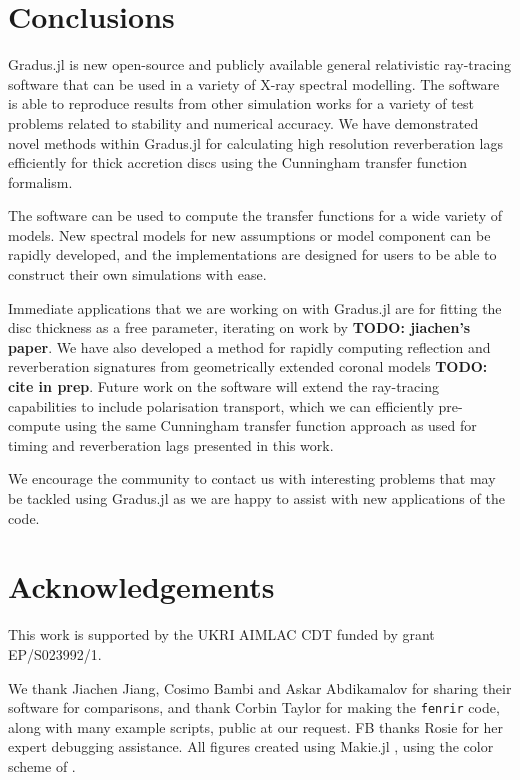 \documentclass[fleqn,usenatbib]{mnras}
\newcommand{\todo}[1]{{\noindent \bf \color{red} TODO: #1}}
\newcommand{\Gradus}{Gradus.jl\xspace}
\begin{document}
\section{Conclusions}
\label{sec:conclusion}

\Gradus is new open-source and publicly available general relativistic
ray-tracing software that can be used in a variety of X-ray spectral modelling.
The software is able to reproduce results from other simulation works for a
variety of test problems related to stability and numerical accuracy. We have
demonstrated novel methods within \Gradus for calculating high resolution
reverberation lags efficiently for thick accretion discs using the Cunningham
transfer function formalism.

The software can be used to compute the transfer functions for a wide variety of
models. New spectral models for new assumptions or model component can be
rapidly developed, and the implementations are designed for users to be able to
construct their own simulations with ease.

Immediate applications that we are working on with \Gradus are for fitting the
disc thickness as a free parameter, iterating on work by \todo{jiachen's paper}.
We have also developed a method for rapidly computing reflection and
reverberation signatures from geometrically extended coronal models \todo{cite
in prep}. Future work on the software will extend the ray-tracing capabilities
to include polarisation transport, which we can efficiently pre-compute using
the same Cunningham transfer function approach as used for timing and
reverberation lags presented in this work.

We encourage the community to contact us with interesting problems that may be
tackled using \Gradus as we are happy to assist with new applications of the
code.

\section*{Acknowledgements}
This work is supported by the UKRI AIMLAC CDT funded by grant EP/S023992/1.

We thank Jiachen Jiang, Cosimo Bambi and Askar Abdikamalov for sharing their
software for comparisons, and thank Corbin Taylor for making the
\texttt{fenrir} code, along with many example scripts, public at our request. FB thanks Rosie for her expert debugging assistance. All figures created using Makie.jl \citep{DanischKrumbiegel2021}, using the color scheme of \cite{wong_points_2011}.
\end{document}
